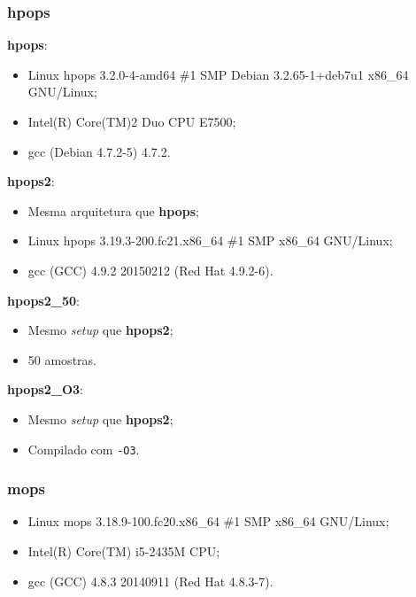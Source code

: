 \documentclass[a4paper, 12pt]{article}
\begin{document}
\subsubsection{hpops}

\textbf{hpops}:

\begin{itemize}
    \item Linux hpops 3.2.0-4-amd64 \#1 SMP Debian 3.2.65-1+deb7u1
        x86\_64 GNU/Linux;
    \item Intel(R) Core(TM)2 Duo CPU E7500;
    \item gcc (Debian 4.7.2-5) 4.7.2.
\end{itemize}

\textbf{hpops2}:

\begin{itemize}
    \item Mesma arquitetura que \textbf{hpops};
    \item Linux hpops 3.19.3-200.fc21.x86\_64 \#1 SMP x86\_64 GNU/Linux;
    \item gcc (GCC) 4.9.2 20150212 (Red Hat 4.9.2-6).
\end{itemize}

\textbf{hpops2\_50}:

\begin{itemize}
    \item Mesmo \textit{setup} que \textbf{hpops2};
    \item 50 amostras.
\end{itemize}

\textbf{hpops2\_O3}:

\begin{itemize}
    \item Mesmo \textit{setup} que \textbf{hpops2};
    \item Compilado com \texttt{-O3}.
\end{itemize}

\subsubsection{mops}

\begin{itemize}
    \item Linux mops 3.18.9-100.fc20.x86\_64 \#1 SMP x86\_64 GNU/Linux;
    \item Intel(R) Core(TM) i5-2435M CPU;
    \item gcc (GCC) 4.8.3 20140911 (Red Hat 4.8.3-7).
\end{itemize}
\end{document}
